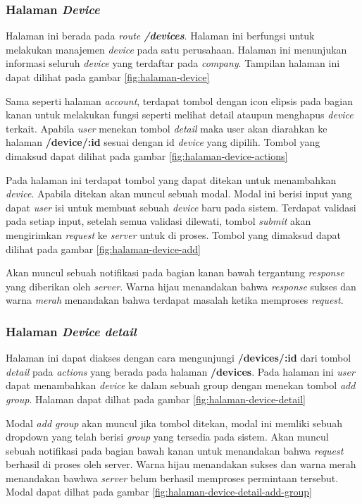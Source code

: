 \subsubsection{Halaman \textit{Device}}
Halaman ini berada pada \textit{route \textbf{/devices}}. Halaman ini berfungsi untuk melakukan manajemen \textit{device} pada satu perusahaan. Halaman ini menunjukan informasi seluruh \textit{device} yang terdaftar pada \textit{company}. Tampilan halaman ini dapat dilihat pada gambar \ref{fig:halaman-device}

Sama seperti halaman \textit{account}, terdapat tombol dengan icon elipsis pada bagian kanan untuk melakukan fungsi seperti melihat detail ataupun menghapus \textit{device} terkait. Apabila \textit{user} menekan tombol \textit{detail} maka user akan diarahkan ke halaman \textbf{/device/:id} sesuai dengan id \textit{device} yang dipilih. Tombol yang dimaksud dapat dilihat pada gambar \ref{fig:halaman-device-actions}

Pada halaman ini terdapat tombol yang dapat ditekan untuk menambahkan \textit{device}. Apabila ditekan akan muncul sebuah modal. Modal ini berisi input yang dapat \textit{user} isi untuk membuat sebuah \textit{device} baru pada sistem. Terdapat validasi pada setiap input, setelah semua validasi dilewati, tombol \textit{submit} akan mengirimkan \textit{request} ke \textit{server} untuk di proses. Tombol yang dimaksud dapat dilihat pada gambar \ref{fig:halaman-device-add}

Akan muncul sebuah notifikasi pada bagian kanan bawah tergantung \textit{response} yang diberikan oleh \textit{server}. Warna hijau menandakan bahwa \textit{response} sukses dan warna \textit{merah} menandakan bahwa terdapat masalah ketika memproses \textit{request}.

\subsubsection{Halaman \textit{Device detail}}
Halaman ini dapat diakses dengan cara mengunjungi \textbf{/devices/:id} dari tombol \textit{detail} pada \textit{actions} yang berada pada halaman \textbf{/devices}. Pada halaman ini \textit{user} dapat menambahkan \textit{device} ke dalam sebuah group dengan menekan tombol \textit{add group}. Halaman dapat dilhat pada gambar \ref{fig:halaman-device-detail}

Modal \textit{add group} akan muncul jika tombol ditekan, modal ini memliki sebuah dropdown yang telah berisi \textit{group} yang tersedia pada sistem. Akan muncul sebuah notifikasi pada bagian bawah kanan untuk menandakan bahwa \textit{request} berhasil di proses oleh server. Warna hijau menandakan sukses dan warna merah menandakan bawhwa \textit{server} belum berhasil memproses permintaan tersebut. Modal dapat dilhat pada gambar \ref{fig:halaman-device-detail-add-group}

